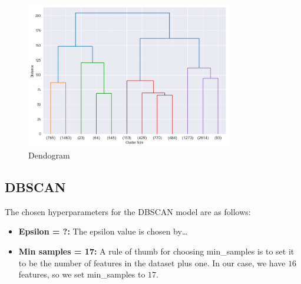 \begin{figure}[H]
    \centering
    \includegraphics[width=0.8\textwidth]{src/figs/dendogram.png} 
    \caption{Dendogram}\label{fig:dendogram}
\end{figure}

\subsection{DBSCAN}

The chosen hyperparameters for the DBSCAN model are as follows:

\begin{itemize}
    \item \textbf{Epsilon = ?:} The epsilon value is chosen by\dots
    \item \textbf{Min samples = 17:} A rule of thumb for choosing min\_samples is to set it to be the number of features in the dataset plus one. In our case, we have $16$ features, so we set min\_samples to $17$.
\end{itemize}
